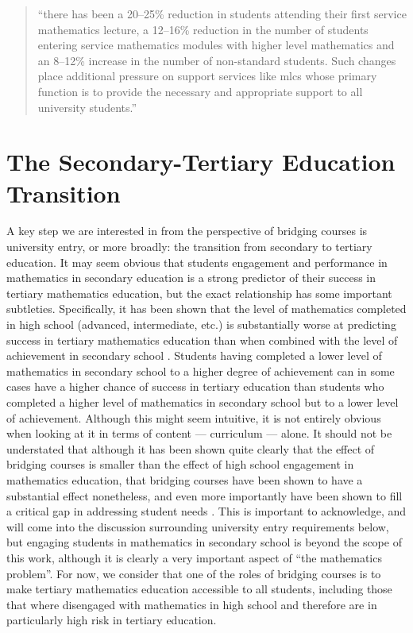 \documentclass[twoside,12pt,a4paper]{report}
\begin{document}
\begin{quote}
	``there has been a 20–25\% reduction in students attending their first
		service mathematics lecture, a 12–16\% reduction in the number of students entering
		service mathematics modules with higher level mathematics and an 8–12\% increase in
		the number of non-standard students. Such changes place additional pressure on
		support services like \gls{mlc}s whose primary function is to provide the necessary and
		appropriate support to all university students.''  \hfill \cite{Johnson2016}
\end{quote}

\section{The Secondary-Tertiary Education Transition}

A key step we are interested in from the perspective of bridging courses is university entry, or more broadly: the transition from secondary to tertiary education. It may seem obvious that students engagement and performance in mathematics in secondary education is a strong predictor of their success in tertiary mathematics education, but the exact relationship has some important subtleties. Specifically, it has been shown that the level of mathematics completed in high school (advanced, intermediate, etc.) is substantially worse at predicting success in tertiary mathematics education than when combined with the level of achievement in secondary school \cite{Kajander2005, Nicholas2015b}.
Students having completed a lower level of mathematics in secondary school to a higher degree of achievement can in some cases have a higher chance of success in tertiary education than students who completed a higher level of mathematics in secondary school but to a lower level of achievement. Although this might seem intuitive, it is not entirely obvious when looking at it in terms of content --- curriculum --- alone. It should not be understated that although it has been shown quite clearly that the effect of bridging courses is smaller than the effect of high school engagement in mathematics education, that bridging courses have been shown to have a substantial effect nonetheless, and even more importantly have been shown to fill a critical gap in addressing student needs \cite{MacGillivray2009}. This is important to acknowledge, and will come into the discussion surrounding university entry requirements below, but engaging students in mathematics in secondary school is beyond the scope of this work, although it is clearly a very important aspect of ``the mathematics problem''. For now, we consider that one of the roles of bridging courses is to make tertiary mathematics education accessible to all students, including those that where disengaged with mathematics in high school and therefore are in particularly high risk in tertiary education.
\end{document}
